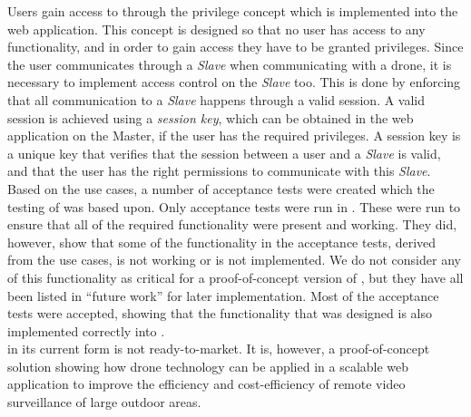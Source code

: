 Users gain access to \projectname{} through the privilege concept which is implemented into the web application. 
This concept is designed so that no user has access to any functionality, and in order to gain access they have to be granted privileges. 
Since the user communicates through a \emph{Slave} when communicating with a drone, it is necessary to implement access control on the \emph{Slave} too. 
This is done by enforcing that all communication to a \emph{Slave} happens through a valid session. 
A valid session is achieved using a \emph{session key}, which can be obtained in the web application on the Master, if the user has the required privileges. 
A session key is a unique key that verifies that the session between a user and a \emph{Slave} is valid, and that the user has the right permissions to communicate with this \emph{Slave}. \\

Based on the use cases, a number of acceptance tests were created which the testing of \projectname{} was based upon. 
Only acceptance tests were run in \projectname{}. 
These were run to ensure that all of the required functionality were present and working. 
They did, however, show that some of the functionality in the acceptance tests, derived from the use cases, is not working or is not implemented. 
We do not consider any of this functionality as critical for a proof-of-concept version of \projectname{}, but they have all been listed in ``future work'' for later implementation. 
Most of the acceptance tests were accepted, showing that the functionality that was designed is also implemented correctly into \projectname{}. \\

\projectname{} in its current form is not ready-to-market.
It is, however, a proof-of-concept solution showing how drone technology can be applied in a scalable web application to improve the efficiency and cost-efficiency of remote video surveillance of large outdoor areas.